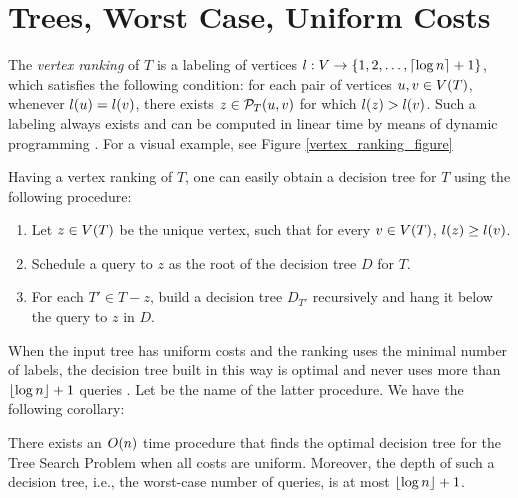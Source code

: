 \newpage
{}
\section{Trees, Worst Case, Uniform Costs}


The \textit{vertex ranking} of $T$ is a labeling of vertices $l:V\to \mathopen{}\left\{ 1,2,\dots,\mathopen{}\left\lceil \log n \right\rceil+1 \right\}$, which satisfies the following condition: for each pair of vertices $u,v\in V\mathopen{}\left( T \right)$, whenever $l\mathopen{}\left( u \right)=l\mathopen{}\left( v \right)$, there exists $z\in \mathcal{P}_T\mathopen{}\left( u,v \right)$ for which $l\mathopen{}\left( z \right)>l\mathopen{}\left( v \right)$. Such a labeling always exists and can be computed in linear time by means of dynamic programming \cite{Schaffer1989OptNodeRankOfTsInLinTime, OnakParys2006GenOfBSSInTsAndFLikePosets, Mozes_Onak2008FindOptTSStartInLinTime}. For a visual example, see Figure \ref{vertex_ranking_figure}


Having a vertex ranking of $T$, one can easily obtain a decision tree for $T$ using the following procedure:
\begin{enumerate}
    \item Let $z\in V\mathopen{}\left( T \right)$ be the unique vertex, such that for every $v\in V\mathopen{}\left( T \right)$, $l\mathopen{}\left( z \right)\geq l\mathopen{}\left( v \right)$.
    \item Schedule a query to $z$ as the root of the decision tree $D$ for $T$.
    \item For each $T'\in T-z$, build a decision tree $D_{T'}$ recursively and hang it below the query to $z$ in $D$.
\end{enumerate} 

When the input tree has uniform costs and the ranking uses the minimal number of labels, the decision tree built in this way is optimal and never uses more than $\mathopen{}\left\lfloor \log n \right\rfloor + 1$ queries \cite{OnakParys2006GenOfBSSInTsAndFLikePosets}. Let \FRankingBasedDT be the name of the latter procedure. We have the following corollary:
  
\begin{corollary}\label{vertexRankingCorollary}
    There exists an $O\mathopen{}\left( n \right)$ time procedure \FRankingBasedDT that finds the optimal decision tree for the Tree Search Problem when all costs are uniform. Moreover, the depth of such a decision tree, i.e., the worst-case number of queries, is at most $\mathopen{}\left\lfloor \log n \right\rfloor + 1$.
\end{corollary}

